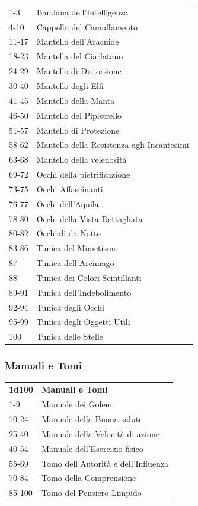 \begin{multicols}{2}
\begin{tabularx}{0.45\textwidth}{lX}
		1-3 &Bandana dell'Intelligenza\\
		4-10 &Cappello del Camuffamento\\
		11-17& Mantello dell'Aracnide\\
		18-23& Mantella del Ciarlatano\\
		24-29& Mantello di Distorsione\\
		30-40& Mantello degli Elfi\\
		41-45& Mantello della Manta\\
		46-50& Mantello del Pipistrello\\
		51-57& Mantello di Protezione\\
		58-62& Mantello della Resistenza agli Incantesimi\\
		63-68& Mantello della velenosità\\
		69-72& Occhi della pietrificazione\\
		73-75& Occhi Affascinanti\\
		76-77& Occhi dell'Aquila\\
		78-80& Occhi della Vista Dettagliata\\
		80-82& Occhiali da Notte\\
		83-86 &Tunica del Mimetismo\\
		87 &Tunica dell’Arcimago\\
		88 &Tunica dei Colori Scintillanti\\
		89-91& Tunica dell’Indebolimento\\
		92-94 &Tunica degli Occhi\\
		95-99 &Tunica degli Oggetti Utili\\
		100 &Tunica delle Stelle\\
	\end{tabularx}


	\subsubsection{Manuali e Tomi}

	\begin{tabularx}{0.45\textwidth}{lX}
		\textbf{1d100} & \textbf{Manuali e Tomi}\\
		1-9 & Manuale dei Golem\\
		10-24 & Manuale della Buona salute\\
		25-40 &Manuale della Velocità di azione\\
		40-54 &Manuale dell'Esercizio fisico\\
		55-69 &Tomo dell'Autorità e dell'Influenza\\
		70-84 &Tomo della Comprensione\\
		85-100& Tomo del Pensiero Limpido\\
	\end{tabularx}


\end{multicols}
